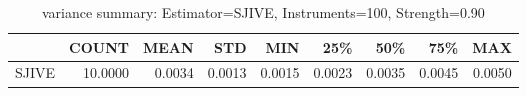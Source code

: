 \begin{table}[ht]
\centering
\caption{variance summary: Estimator=SJIVE, Instruments=100, Strength=0.90}
\begin{tabular}{lrrrrrrrr}
\toprule
 & COUNT & MEAN & STD & MIN & 25\% & 50\% & 75\% & MAX \\
\midrule
SJIVE & 10.0000 & 0.0034 & 0.0013 & 0.0015 & 0.0023 & 0.0035 & 0.0045 & 0.0050 \\
\bottomrule
\end{tabular}
\end{table}
